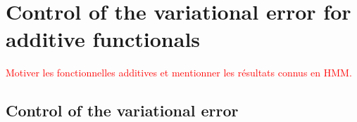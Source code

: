 \documentclass{article}
\newcommand{\Xfd}{\mathcal{X}}
\newcommand{\uksymbol}{\ell}
\newcommand{\ud}[1]{\uksymbol_{#1}}
\newcommand{\nset}{\mathbb{N}}
\newcommand{\1}{\mathbbm{1}}
\newcommand{\uk}[1]{\mathbf{L}_{#1}}
\newcommand{\tensprod}{\otimes}
\newcommand{\Xset}{\mathsf{X}}
\newcommand{\hk}{\kernel{Q}}
\newcommand{\md}[1]{g_{#1}}
\newcommand{\af}[1]{h_{#1}}
\newcommand{\kernel}[1]{\mathbf{#1}}
\newcommand{\rmd}{\ensuremath{\mathrm{d}}}
\newcommand{\eqdef}{\ensuremath{:=}}
\begin{document}

\section{Control of the variational error for additive functionals}
\textcolor{red}{Motiver les fonctionnelles additives et mentionner les r\'esultats connus en HMM.}
\subsection{Control of the variational error}
\end{document}
